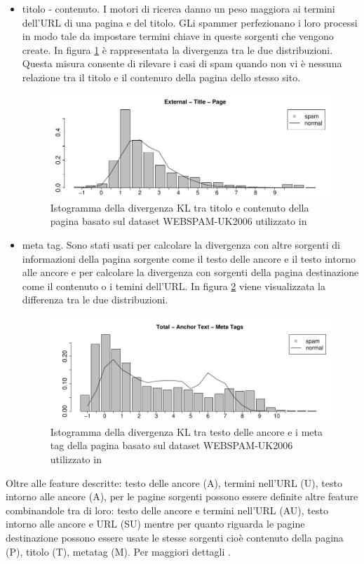 \begin{itemize}
\item titolo - contenuto. I motori di ricerca danno un peso maggiora ai termini dell'URL di una pagina e del titolo. GLi spammer perfezionano i loro processi in modo tale da impostare termini chiave in queste sorgenti che vengono create. In figura \ref{fig:martinez7} è rappresentata la divergenza tra le due distribuzioni. Questa misura consente di rilevare i casi di spam quando non vi è nessuna relazione tra il titolo e il contenuro della pagina dello stesso sito.
\begin{figure}[htbp]
\centering
\includegraphics[width=12cm]{immagini/martinez/martinez7}
\caption{Istogramma della divergenza KL tra titolo  e contenuto della pagina basato sul dataset WEBSPAM-UK2006 utilizzato in \cite{Martinez-Romo:2009:WSI:1531914.1531920}}
\label{fig:martinez7}
\end{figure}

\item meta tag. Sono stati usati per calcolare la divergenza con altre sorgenti di informazioni della pagina sorgente come il testo delle ancore e il testo intorno alle ancore e per calcolare la divergenza con sorgenti della pagina destinazione come il contenuto o i temini dell'URL. In figura \ref{fig:martinez8} viene visualizzata la differenza tra le due distribuzioni.
\begin{figure}[htbp]
\centering
\includegraphics[width=12cm]{immagini/martinez/martinez8}
\caption{Istogramma della divergenza KL tra testo delle ancore  e i meta tag della pagina basato sul dataset WEBSPAM-UK2006 utilizzato in \cite{Martinez-Romo:2009:WSI:1531914.1531920}}
\label{fig:martinez8}
\end{figure}
\end{itemize}
Oltre alle feature descritte: testo delle ancore (A), termini nell'URL (U), testo intorno alle ancore (A), per le pagine sorgenti possono essere definite altre feature combinandole tra di loro: testo delle ancore e termini nell'URL (AU), testo intorno alle ancore e URL (SU) mentre per quanto riguarda le pagine destinazione possono essere usate le stesse sorgenti cioè contenuto della pagina (P), titolo (T), metatag (M). Per maggiori dettagli \cite{Martinez-Romo:2009:WSI:1531914.1531920}.

